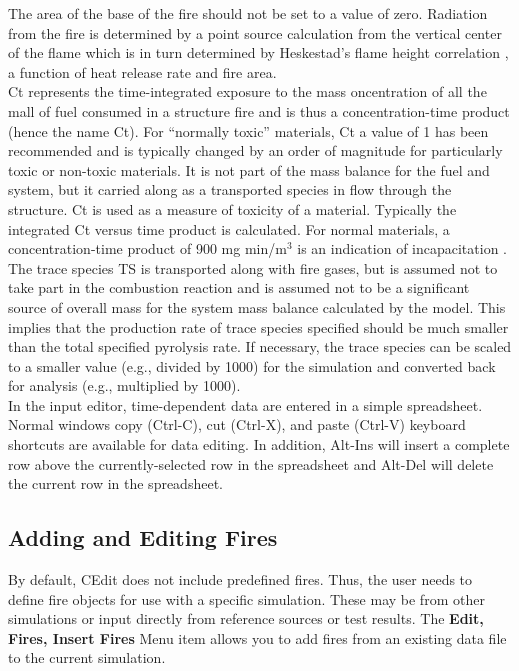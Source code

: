 {The area of the base of the fire should not be set to a value of zero. Radiation from the fire is determined by a point source calculation from the vertical center of the flame which is in turn determined by Heskestad's flame height correlation \cite{Heskestad:2002}, a function of heat release rate and fire area. \\

Ct represents the time-integrated exposure to the mass oncentration of all the mall of fuel consumed in a structure fire and is thus a concentration-time product (hence the name Ct). For ``normally toxic'' materials, Ct a value of 1 \cite{Levin:1982} has been recommended and is typically changed by an order of magnitude for particularly toxic or non-toxic materials.  It is not part of the mass balance for the fuel and system, but it carried along as a transported species in flow through the structure. Ct is used as a measure of toxicity of a material.  Typically the integrated Ct versus time product is calculated. For normal materials, a concentration-time product of 900 mg min/m$^3$ is an indication of incapacitation \cite{Levin:1982}. \\

The trace species TS is transported along with fire gases, but is assumed not to take part in the combustion reaction and is assumed not to be a significant source of overall mass for the system mass balance calculated by the model. This implies that the production rate of trace species specified should be much smaller than the total specified pyrolysis rate. If necessary, the trace species can be scaled to a smaller value (e.g., divided by 1000) for the simulation and converted back for analysis (e.g., multiplied by 1000). \\

In the input editor, time-dependent data are entered in a simple spreadsheet. Normal windows copy (Ctrl-C), cut (Ctrl-X), and paste (Ctrl-V) keyboard shortcuts are available for data editing. In addition, Alt-Ins will insert a complete row above the currently-selected row in the spreadsheet and Alt-Del will delete the current row in the spreadsheet.
}

\subsection{Adding and Editing Fires}

By default, CEdit does not include predefined fires. Thus, the user needs to define fire objects for use with a specific simulation.  These may be from other simulations or input directly from reference sources or test results. The \textbf{Edit, Fires, Insert Fires} Menu item allows you to add fires from an existing data file to the current simulation.

